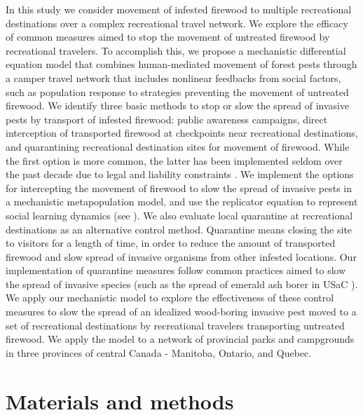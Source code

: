 In this study we consider movement of infested firewood to multiple recreational destinations over a complex recreational travel network. We explore the efficacy of common measures aimed to stop the movement of untreated firewood by recreational travelers. To accomplish this, we propose a mechanistic differential equation model that combines human-mediated movement of forest pests through a camper travel network that includes nonlinear feedbacks from social factors, such as population response to strategies preventing the movement of untreated firewood. We identify three basic methods to stop or slow the spread of invasive pests by transport of infested firewood: public awareness campaigns, direct interception of transported firewood at checkpoints near recreational destinations, and quarantining recreational destination sites for movement of firewood. While the first option is more common, the latter has been implemented seldom over the past decade due to legal and liability constraints \cite{reid2017,weber2006,nearing2012, haack2010incidence}. We implement the options for intercepting the movement of firewood to slow the spread of invasive pests in a mechanistic metapopulation model, and use the replicator equation to represent social learning dynamics (see \cite{henderson2013carrot,barlow2014modelling,bauch2005imitation,hofbauer1998evolutionary}). We also evaluate local quarantine at recreational destinations as an alternative control method. Quarantine means closing the site to visitors for a length of time, in order to reduce the amount of transported firewood and slow spread of invasive organisms from other infested locations. Our implementation of quarantine measures follow common practices aimed to slow the spread of invasive species (such as the spread of emerald ash borer in USaC \cite{muirhead2006modelling,gottwald2001citrus}). We apply our mechanistic model to explore the effectiveness of these control measures to slow the spread of an idealized wood-boring invasive pest moved to a set of recreational destinations by recreational travelers transporting untreated firewood. We apply the model to a network of provincial parks and campgrounds in three provinces of central Canada - Manitoba, Ontario, and Quebec.

\section{Materials and methods}



